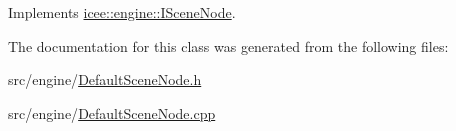 Implements \hyperlink{classicee_1_1engine_1_1ISceneNode_a2951ecb91b29bcc74d992de4880daa0f}{icee::engine::ISceneNode}.



The documentation for this class was generated from the following files:\begin{DoxyCompactItemize}
\item 
src/engine/\hyperlink{DefaultSceneNode_8h}{DefaultSceneNode.h}\item 
src/engine/\hyperlink{DefaultSceneNode_8cpp}{DefaultSceneNode.cpp}\end{DoxyCompactItemize}
